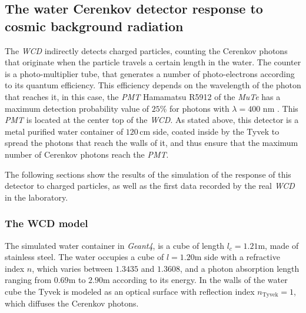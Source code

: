 \documentclass[submitting]{nst}
\begin{document}

\subsection{The water Cerenkov detector response to cosmic background radiation}\label{sec:wcd-response}
The \textsl{WCD} indirectly detects charged particles, counting the Cerenkov photons that originate when the particle travels a certain length in the water. The counter is a photo-multiplier tube, that generates a number of photo-electrons according to its quantum efficiency. This efficiency depends on the wavelength of the photon that reaches it, in this case, the \textsl{PMT} Hamamatsu R5912 of the \textsl{MuTe} has a maximum detection probability value of $25$\% for photons with $\lambda = 400$ nm \cite{Hamamatsu2018}. This \textsl{PMT} is located at the center top of the \textsl{WCD}. As stated above, this detector is a metal purified water container of $120$\,cm side, coated inside by the Tyvek to spread the photons that reach the walls of it, and thus ensure that the maximum number of Cerenkov photons reach the \textsl{PMT}. 

The following sections show the results of the simulation of the response of this detector to charged particles, as well as the first data recorded by the real \textsl{WCD} in the laboratory.


\subsubsection{The WCD model}\label{sec:wcd-model}
The simulated water container in \textsl{Geant4}, is a cube of length $l_c=1.21$m, made of stainless steel. The water occupies a cube of $ l=1.20$m side with a refractive index $n$, which varies between $1.3435$ and $1.3608$, and a photon absorption length ranging from $0.69$m to $2.90$m according to its energy. In the walls of the water cube the Tyvek is modeled as an optical surface with reflection index $n_{\mathrm{Tyvek}} = 1 $, which diffuses the Cerenkov photons.
\end{document}
